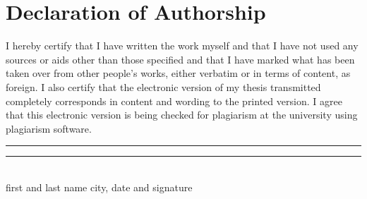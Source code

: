 
\section*{Declaration of Authorship}


I hereby certify that I have written the work myself and that I have not used any sources or aids other than those specified and that I have marked what has been taken over from other people's works, either verbatim or in terms of content, as foreign. I also certify that the electronic version of my thesis transmitted completely corresponds in content and wording to the printed version. I agree that this electronic version is being checked for plagiarism at the university using plagiarism software.

\vspace{5cm}
\noindent\rule[0.5ex]{8em}{0.5pt} \hfill \rule[0.5ex]{10em}{0.5pt}\\
\noindent first and last name \hfill city, date and signature